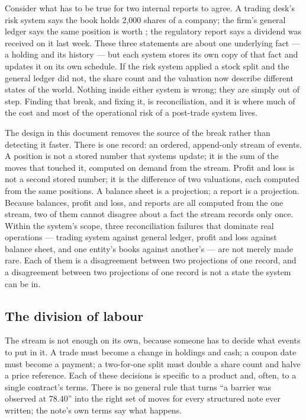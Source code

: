 Consider what has to be true for two internal reports to agree. A trading desk's
risk system says the book holds 2{,}000 shares of a company; the firm's general
ledger says the same position is worth ; the regulatory report
says a dividend was received on it last week. These three statements are about one
underlying fact --- a holding and its history --- but each system stores its own
copy of that fact and updates it on its own schedule. If the risk system applied
a stock split and the general ledger did not, the share count and the valuation
now describe different states of the world. Nothing inside either system is wrong;
they are simply out of step. Finding that break, and fixing it, is reconciliation,
and it is where much of the cost and most of the operational risk of a
post-trade system lives.

The design in this document removes the source of the break rather than
detecting it faster. There is one record: an ordered, append-only stream of
events. A position is not a stored number that systems update; it is the sum of
the moves that touched it, computed on demand from the stream. Profit and loss is
not a second stored number; it is the difference of two valuations, each computed
from the same positions. A balance sheet is a projection; a report is a
projection. Because balances, profit and loss, and reports are all computed from
the one stream, two of them cannot disagree about a fact the stream records only
once. Within the system's scope, three reconciliation failures that dominate
real operations --- trading system against general ledger, profit and loss
against balance sheet, and one entity's books against another's --- are not
merely made rare. Each of them is a disagreement between two projections of one
record, and a disagreement between two projections of one record is not a state
the system can be in.

\subsection{The division of labour}

The stream is not enough on its own, because someone has to decide what events to
put in it. A trade must become a change in holdings and cash; a coupon date must
become a payment; a two-for-one split must double a share count and halve a price
reference. Each of these decisions is specific to a product and, often, to a
single contract's terms. There is no general rule that turns ``a barrier was
observed at 78.40'' into the right set of moves for every structured note ever
written; the note's own terms say what happens.

